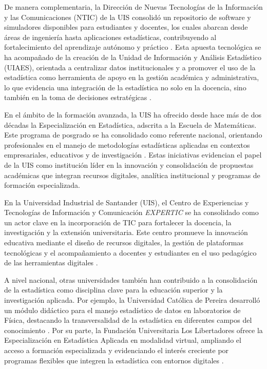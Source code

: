 \documentclass[letter,oneside,12pt,spanish]{report}
\begin{document}
De manera complementaria, la Dirección de Nuevas Tecnologías de la Información y las Comunicaciones
 (NTIC) de la UIS consolidó un repositorio de software y simuladores disponibles para estudiantes 
 y docentes, los cuales abarcan desde áreas de ingeniería hasta aplicaciones estadísticas, 
 contribuyendo al fortalecimiento del aprendizaje autónomo y práctico \parencite{nticsf}. Esta 
 apuesta tecnológica se ha acompañado de la creación de la Unidad de Información y Análisis 
 Estadístico (UIAES), orientada a centralizar datos institucionales y a promover el uso de la 
 estadística como herramienta de apoyo en la gestión académica y administrativa, lo que evidencia
  una integración de la estadística no solo en la docencia, sino también en la toma de decisiones 
  estratégicas \parencite{uiassf}.

En el ámbito de la formación avanzada, la UIS ha ofrecido desde hace más de dos décadas la 
Especialización en Estadística, adscrita a la Escuela de Matemáticas. Este programa de posgrado 
se ha consolidado como referente nacional, orientando profesionales en el manejo de metodologías 
estadísticas aplicadas en contextos empresariales, educativos y de investigación 
\parencite{especializacionstatssf}. Estas iniciativas evidencian el papel de la UIS como 
institución líder en la innovación y consolidación de propuestas académicas que integran 
recursos digitales, analítica institucional y programas de formación especializada.

En la Universidad Industrial de Santander (UIS), el Centro de Experiencias y 
Tecnologías de Información y Comunicación \textit{EXPERTIC} se ha consolidado como un actor clave 
en la incorporación de TIC para fortalecer la docencia, la investigación y la extensión universitaria. 
Este centro promueve la innovación educativa mediante el diseño de recursos digitales, la gestión de 
plataformas tecnológicas y el acompañamiento a docentes y estudiantes en el uso pedagógico de las 
herramientas digitales \parencite{UIS2025a}. 

A nivel nacional, otras universidades también han contribuido a la consolidación de la estadística
 como disciplina clave para la educación superior y la investigación aplicada. Por ejemplo, la 
 Universidad Católica de Pereira desarrolló un módulo didáctico para el manejo estadístico de 
 datos en laboratorios de Física, destacando la transversalidad de la estadística en diferentes 
 campos del conocimiento \parencite{ucp2018}. Por su parte, la Fundación Universitaria Los 
 Libertadores ofrece la Especialización en Estadística Aplicada en modalidad virtual, ampliando 
 el acceso a formación especializada y evidenciando el interés creciente por programas flexibles 
 que integren la estadística con entornos digitales \parencite{libertadoressf}.
\end{document}
